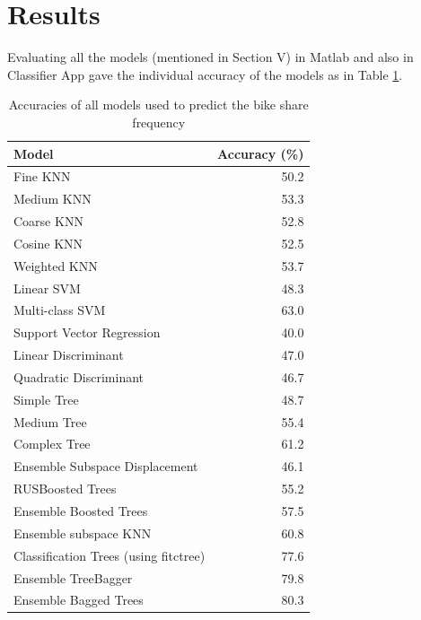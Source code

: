 \documentclass[journal, a4paper]{IEEEtran}
\begin{document}
\section{Results}
Evaluating all the models (mentioned in Section V) in Matlab and also in Classifier App gave the individual accuracy of the models as in Table \ref{resultsAllAccuracies}.
\begin{center}
\begin{table}[ht!]
\centering
 \begin{tabular}{||l r||} 
 \hline
 Model & Accuracy (\%) \\ [0.5ex] 
 \hline\hline
Fine KNN & 50.2 \\
\hline
Medium KNN & 53.3 \\
\hline
Coarse KNN & 52.8 \\
\hline
Cosine KNN & 52.5 \\
\hline
Weighted KNN & 53.7 \\
\hline
Linear SVM & 48.3 \\
\hline 
Multi-class SVM & 63.0 \\
\hline
Support Vector Regression & 40.0\\
\hline 
Linear Discriminant & 47.0\\
\hline 
Quadratic Discriminant & 46.7\\
\hline
Simple Tree & 48.7\\
\hline 
Medium Tree & 55.4\\
\hline 
Complex Tree & 61.2\\
\hline 
Ensemble Subspace Displacement & 46.1\\
\hline
RUSBoosted Trees & 55.2\\
\hline 
Ensemble Boosted Trees & 57.5\\
\hline 
Ensemble subspace KNN & 60.8\\
\hline
Classification Trees (using fitctree) & 77.6\\
\hline 
Ensemble TreeBagger & 79.8 \\
\hline 
Ensemble Bagged Trees & 80.3\\[1ex] 
 \hline
\end{tabular}
\caption{Accuracies of all models used to predict the bike share frequency}
 \label{resultsAllAccuracies}
\end{table}
\end{center}
\end{document}
